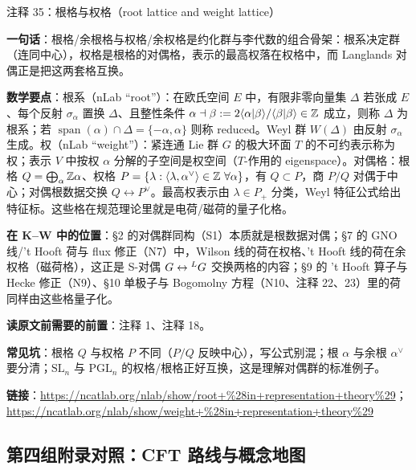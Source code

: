 \begin{kcard}{注释 35：根格与权格（root lattice and weight lattice）}

\textbf{一句话}：根格/余根格与权格/余权格是约化群与李代数的组合骨架：根系决定群（连同中心），权格是根格的对偶格，表示的最高权落在权格中，而 Langlands 对偶正是把这两套格互换。

\textbf{数学要点}：根系（nLab “root”）：在欧氏空间 $E$ 中，有限非零向量集 $\Delta$ 若张成 $E$、每个反射 $\sigma_\alpha$ 置换 $\Delta$、且整性条件 $\alpha\dashv\beta:=2\langle\alpha|\beta\rangle/\langle\beta|\beta\rangle\in\mathbb{Z}$ 成立，则称 $\Delta$ 为根系；若 $\operatorname{span}(\alpha)\cap\Delta=\{-\alpha,\alpha\}$ 则称 reduced。Weyl 群 $W(\Delta)$ 由反射 $\sigma_\alpha$ 生成。权（nLab “weight”）：紧连通 Lie 群 $G$ 的极大环面 $T$ 的不可约表示称为权；表示 $V$ 中按权 $\alpha$ 分解的子空间是权空间（$T$-作用的 eigenspace）。对偶格：根格 $Q=\bigoplus_\alpha\mathbb{Z}\alpha$、权格 $P=\{\lambda:\langle\lambda,\alpha^\vee\rangle\in\ZZ\ \forall\alpha\}$，有 $Q\subset P$，商 $P/Q$ 对偶于中心；对偶根数据交换 $Q\leftrightarrow P^\vee$。最高权表示由 $\lambda\in P_+$ 分类，Weyl 特征公式给出特征标。这些格在规范理论里就是电荷/磁荷的量子化格。

\textbf{在 K--W 中的位置}：§2 的对偶群同构（S1）本质就是根数据对偶；§7 的 GNO 线/'t Hooft 荷与 flux 修正（N7）中，Wilson 线的荷在权格、't Hooft 线的荷在余权格（磁荷格），这正是 S-对偶 $G\leftrightarrow{}^{L}G$ 交换两格的内容；§9 的 't Hooft 算子与 Hecke 修正（N9）、§10 单极子与 Bogomolny 方程（N10、注释 22、23）里的荷同样由这些格量子化。

\textbf{读原文前需要的前置}：注释 1、注释 18。

\textbf{常见坑}：根格 $Q$ 与权格 $P$ 不同（$P/Q$ 反映中心），写公式别混；根 $\alpha$ 与余根 $\alpha^\vee$ 要分清；$\mathrm{SL}_n$ 与 $\mathrm{PGL}_n$ 的权格/根格正好互换，这是理解对偶群的标准例子。

\noindent\textbf{链接}：\url{https://ncatlab.org/nlab/show/root+%28in+representation+theory%29}；\url{https://ncatlab.org/nlab/show/weight+%28in+representation+theory%29}
\end{kcard}

\subsection*{第四组\quad 附录对照：CFT 路线与概念地图}

